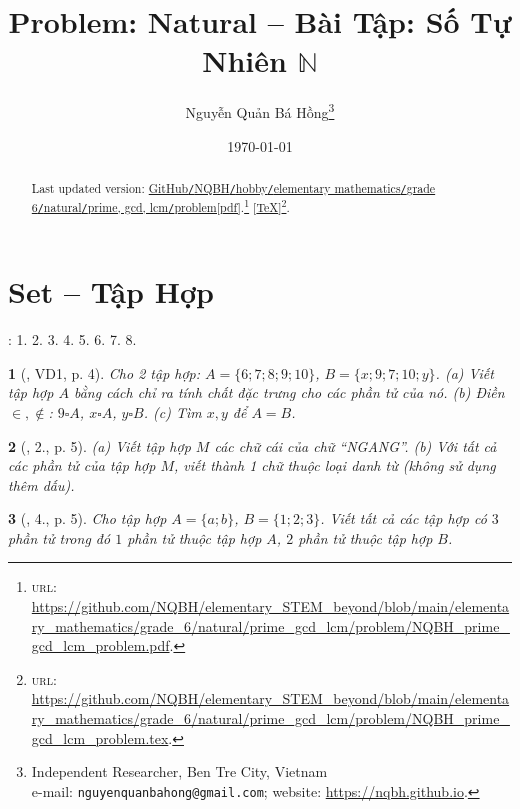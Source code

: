 \documentclass{article}
\title{Problem: Natural -- Bài Tập: Số Tự Nhiên $\mathbb{N}$}
\author{Nguyễn Quản Bá Hồng\footnote{Independent Researcher, Ben Tre City, Vietnam\\e-mail: \texttt{nguyenquanbahong@gmail.com}; website: \url{https://nqbh.github.io}.}}
\date{\today}
\newtheorem{baitoan}{}
\begin{document}
\maketitle
\begin{abstract}
	Last updated version: \href{https://github.com/NQBH/elementary_STEM_beyond/blob/main/elementary_mathematics/grade_6/natural/prime_gcd_lcm/problem/NQBH_prime_gcd_lcm_problem.pdf}{GitHub{\tt/}NQBH{\tt/}hobby{\tt/}elementary mathematics{\tt/}grade 6{\tt/}natural{\tt/}prime, gcd, lcm{\tt/}problem[pdf]}.\footnote{\textsc{url}: \url{https://github.com/NQBH/elementary_STEM_beyond/blob/main/elementary_mathematics/grade_6/natural/prime_gcd_lcm/problem/NQBH_prime_gcd_lcm_problem.pdf}.} [\href{https://github.com/NQBH/elementary_STEM_beyond/blob/main/elementary_mathematics/grade_6/natural/prime_gcd_lcm/problem/NQBH_prime_gcd_lcm_problem.tex}{\TeX}]\footnote{\textsc{url}: \url{https://github.com/NQBH/elementary_STEM_beyond/blob/main/elementary_mathematics/grade_6/natural/prime_gcd_lcm/problem/NQBH_prime_gcd_lcm_problem.tex}.}. 
\end{abstract}
\tableofcontents


\section{Set -- Tập Hợp}
\cite[\S1, pp. 6--7]{SBT_Toan_6_Canh_Dieu_tap_1}: 1. 2. 3. 4. 5. 6. 7. 8.

\begin{baitoan}[\cite{Tuyen_Toan_6}, VD1, p. 4]
	Cho 2 tập hợp: $A = \{6;7;8;9;10\}$, $B = \{x;9;7;10;y\}$. (a) Viết tập hợp $A$ bằng cách chỉ ra tính chất đặc trưng cho các phần tử của nó. (b) Điền $\in,\notin$: $9\square A$, $x\square A$, $y\square B$. (c) Tìm $x,y$ để $A = B$.
\end{baitoan}

\begin{baitoan}[\cite{Tuyen_Toan_6}, 2., p. 5]
	(a) Viết tập hợp $M$ các chữ cái của chữ ``NGANG''. (b) Với tất cả các phần tử của tập hợp $M$, viết thành 1 chữ thuộc loại danh từ (không sử dụng thêm dấu).
\end{baitoan}

\begin{baitoan}[\cite{Tuyen_Toan_6}, 4., p. 5]
	Cho tập hợp $A = \{a;b\}$, $B = \{1;2;3\}$. Viết tất cả các tập hợp có $3$ phần tử trong đó $1$ phần tử thuộc tập hợp $A$, $2$ phần tử thuộc tập hợp $B$.
\end{baitoan}
\end{document}
